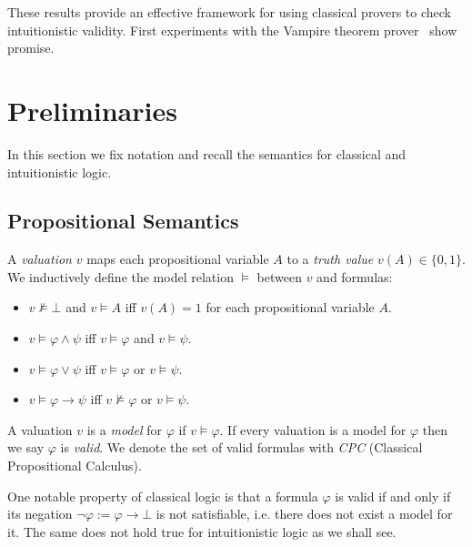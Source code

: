 \documentclass[a4paper,UKenglish,cleveref, autoref, thm-restate]{lipics-v2021}
\begin{document}
These results provide an effective framework for using classical provers to check intuitionistic validity. First experiments with the Vampire theorem prover~\cite{kovacs2013first} show promise.


\section{Preliminaries}

In this section we fix notation and recall the semantics for classical and intuitionistic logic.

\subsection{Propositional Semantics}

\begin{definition}
A \emph{valuation} $v$ maps each propositional variable $A$ to a \emph{truth value} $v(A)\in\{0, 1\}$. We inductively define the model relation $\models$ between $v$ and formulas:
	\begin{itemize}
		\item $v\not\models \bot$ and $v\models A$ iff $v(A) = 1$ for each propositional variable $A$.
		\item $v\models \varphi\wedge\psi$ iff $v\models\varphi$ and $v\models\psi$.
		\item $v\models\varphi\vee\psi$ iff $v\models\varphi$ or $v\models\psi$.
		\item $v\models\varphi\to \psi$ iff $v\not\models\varphi$ or $v\models\psi$.
	\end{itemize}
A valuation $v$ is a \emph{model} for $\varphi$ if $v\models\varphi$. If every valuation is a model for $\varphi$ then we say $\varphi$ is \emph{valid}. We denote the set of valid formulas with \emph{CPC} (Classical Propositional Calculus).
\end{definition}

One notable property of classical logic is that a formula $\varphi$ is valid if and only if its negation $\neg\varphi := \varphi\to\bot$ is not satisfiable, i.e. there does not exist a model for it. The same does not hold true for intuitionistic logic as we shall see.
\end{document}

